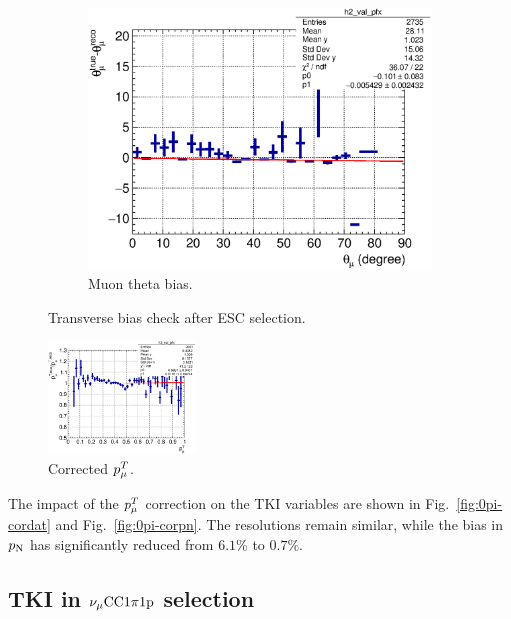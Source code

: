 \begin{figure}[!htb]
           \begin{subfigure}{0.3\textwidth}
                \includegraphics[width=\textwidth]{figures/theta_mu_vs_theta_mu_res_hist2d_al14.eps}
                \caption{Muon theta bias.}
                \label{fig:0pi-mutheta-bias}
           \end{subfigure}
           \caption{Transverse bias check after ESC selection.}
           \label{fig:0piptbiascheck}
        \end{figure}
            
        \begin{figure}[!htb] 	
            \centering 		
            \includegraphics[width=0.35\textwidth]{figures/mu_pt_vs_cor_mu_pt_bias_hist2d_al14.eps}
            \caption{\label{fig:cormupt} Corrected $p_{\mu}^T$.} 
        \end{figure}

        The impact of the $p_{\mu}^T$ correction on the TKI variables are shown in Fig.~\ref{fig:0pi-cordat} and Fig.~\ref{fig:0pi-corpn}. The resolutions remain similar, while the bias in $p_\textrm{N}$ has significantly reduced from $6.1\%$ to $0.7\%$.

    \subsection{\label{sec:1pi-tki} TKI in $\nu_{\mu}\textrm{CC}1\pi1\textrm{p}$ selection}

